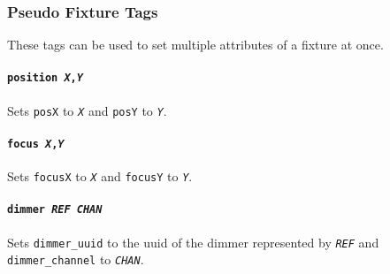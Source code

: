 \documentclass[a4paper]{article}
\begin{document}
\subsubsection{Pseudo Fixture Tags}
These tags can be used to set multiple attributes of a fixture at once.

\paragraph{\texttt{position \textit{X},\textit{Y}}}
Sets \texttt{posX} to \texttt{\textit{X}} and \texttt{posY} to 
\texttt{\textit{Y}}.

\paragraph{\texttt{focus \textit{X},\textit{Y}}}
Sets \texttt{focusX} to \texttt{\textit{X}} and \texttt{focusY} to 
\texttt{\textit{Y}}.

\paragraph{\texttt{dimmer \textit{REF} \textit{CHAN}}}
Sets \texttt{dimmer\_uuid} to the uuid of the dimmer represented by 
\texttt{\textit{REF}} and \texttt{dimmer\_channel} to \texttt{\textit{CHAN}}.
\end{document}
